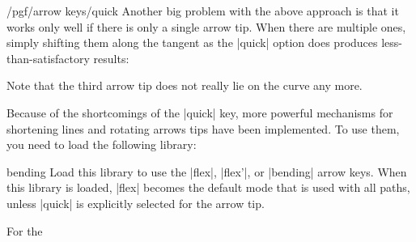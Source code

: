 \begin{key}{/pgf/arrow keys/quick}
  Another big problem with the above approach is that it works only
  well if there is only a single arrow tip. When there are multiple
  ones, simply shifting them along the tangent as the |quick| option
  does produces less-than-satisfactory results:
\begin{codeexample}[]
\end{codeexample}
  Note that the third arrow tip does not really lie on the curve any 
  more. 
\end{key}

Because of the shortcomings of the |quick| key, more powerful
mechanisms for shortening lines and rotating arrows tips have been
implemented. To use them, you need to load the following library:

\begin{tikzlibrary}{bending}
  Load this library to use the |flex|, |flex'|, or |bending| arrow
  keys. When this library is loaded, |flex| becomes the default mode
  that is used with all paths, unless |quick| is explicitly selected
  for the arrow tip.
\end{tikzlibrary}
For the 

